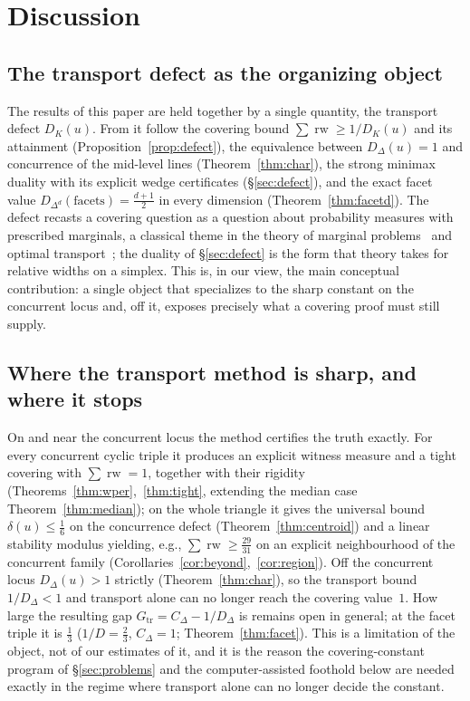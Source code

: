 \documentclass{aims}
\numberwithin{equation}{section}
\theoremstyle{plain}
\theoremstyle{definition}
\theoremstyle{remark}
\newcommand{\rw}{\operatorname{rw}}
\begin{document}
\section{Discussion}\label{sec:discussion}

\subsection*{The transport defect as the organizing object}
The results of this paper are held together by a single quantity, the
transport defect $D_K(u)$. From it follow the covering bound
$\sum\rw\ge 1/D_K(u)$ and its attainment (Proposition~\ref{prop:defect}),
the equivalence between $D_\Delta(u)=1$ and concurrence of the mid-level
lines (Theorem~\ref{thm:char}), the strong minimax duality with its explicit
wedge certificates (\S\ref{sec:defect}), and the exact facet value
$D_{\Delta^d}(\mathrm{facets})=\tfrac{d+1}{2}$ in every dimension
(Theorem~\ref{thm:facetd}). The defect recasts a covering question as a
question about probability measures with prescribed marginals, a classical
theme in the theory of marginal problems~\cite{Strassen65,Kellerer84} and
optimal transport~\cite{Villani09}; the duality of \S\ref{sec:defect} is the
form that theory takes for relative widths on a simplex. This is, in our view,
the main conceptual contribution: a single object that specializes to the
sharp constant on the concurrent locus and, off it, exposes precisely what a
covering proof must still supply.

\subsection*{Where the transport method is sharp, and where it stops}
On and near the concurrent locus the method certifies the truth exactly. For
every concurrent cyclic triple it produces an explicit witness measure and a
tight covering with $\sum\rw=1$, together with their rigidity
(Theorems~\ref{thm:wper},~\ref{thm:tight}, extending the median case
Theorem~\ref{thm:median}); on the whole triangle it gives the universal
bound $\delta(u)\le\tfrac16$ on the concurrence defect (Theorem~\ref{thm:centroid})
and a linear stability modulus yielding, e.g., $\sum\rw\ge\tfrac{29}{31}$ on an
explicit neighbourhood of the concurrent family
(Corollaries~\ref{cor:beyond},~\ref{cor:region}). Off the concurrent locus
$D_\Delta(u)>1$ strictly (Theorem~\ref{thm:char}), so the transport bound
$1/D_\Delta<1$ and transport alone can no longer reach the covering value~$1$.
How large the resulting gap $G_{\mathrm{tr}}=C_\Delta-1/D_\Delta$ is remains
open in general; at the facet triple it is $\tfrac13$ ($1/D=\tfrac23$,
$C_\Delta=1$; Theorem~\ref{thm:facet}).
This is a limitation of the object, not of our estimates of it, and it is the
reason the covering-constant program of \S\ref{sec:problems} and the
computer-assisted foothold below are needed exactly in the regime where
transport alone can no longer decide the constant.
\end{document}
